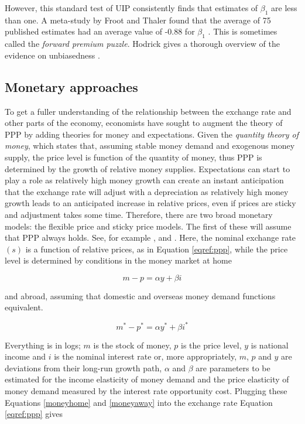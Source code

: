 \documentclass[12pt, a4paper, oneside]{article}\usepackage[]{graphicx}\usepackage[]{color}
\begin{document}
However, this standard test of UIP consistently finds that estimates of  $\beta_1$ are less than one.  A meta-study by Froot and Thaler found that the average of 75 published estimates had an average value of -0.88 for $\beta_1$ \citep*{FrootUIP}.   This is sometimes called the \emph{forward premium puzzle}.  Hodrick gives  a thorough overview of the evidence on unbiasedness \citep{Hodrick1988}.  

\subsection{Monetary approaches}
\label{secref:money}
To get a fuller understanding of the relationship between the exchange rate and other parts of the economy, economists have sought to augment the theory of PPP by adding theories for money and expectations.   Given the \emph{quantity theory of money}, which states that, assuming stable money demand and exogenous money supply, the price level is function of the quantity of money, thus PPP is determined by the growth of relative money supplies.       Expectations can start to play a role as relatively high money growth can create an instant anticipation that the exchange rate will adjust with a depreciation as relatively high money growth leads to an anticipated increase in relative prices, even if prices are sticky and adjustment takes some time. Therefore, there are two broad monetary models: the flexible price and sticky price models.  The first of these will assume that PPP always holds.  See, for example \citep{Frenkel1976Money},  \citep{Mussa1976Money} and \citep{Bilson1978Money}.  Here, the nominal exchange rate $(s)$ is a function of relative prices, as in Equation \ref{eqref:ppp}, 
while the price level is determined by conditions in the money market at home

\begin{equation}\label{moneyhome}
m-p=\alpha y + \beta i 
\end{equation}

and abroad, assuming that domestic and overseas money demand functions equivalent. 

\begin{equation}\label{moneyaway}
m^*-p^*=\alpha y^* + \beta i^{*}
\end{equation}

Everything is in logs; $m$ is the stock of money, $p$ is the price level, $y$ is national income and $i$ is the nominal interest rate or, more appropriately, $m$, $p$ and $y$ are deviations from their long-run growth path, $\alpha$ and $\beta$ are parameters to be estimated for the income elasticity of money demand and the price elasticity of money demand measured by the interest rate opportunity cost.  Plugging these Equations \eqref{moneyhome} and \eqref{moneyaway} into the exchange rate Equation \eqref{eqref:ppp} gives
\end{document}
